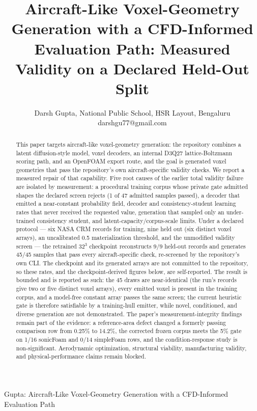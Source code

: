 \documentclass[journal]{IEEEtran}
\begin{document}
\title{Aircraft-Like Voxel-Geometry Generation with a CFD-Informed Evaluation Path: Measured Validity on a Declared Held-Out Split}
\author{Darsh Gupta, National Public School, HSR Layout, Bengaluru \\ darshgu77@gmail.com}

%
{Gupta: Aircraft-Like Voxel-Geometry Generation with a CFD-Informed Evaluation Path}

\maketitle

\begin{abstract}
This paper targets aircraft-like voxel-geometry generation: the repository combines a latent diffusion-style model, voxel decoders, an internal D3Q27 lattice-Boltzmann scoring path, and an OpenFOAM export route, and the goal is generated voxel geometries that pass the repository's own aircraft-specific validity checks. We report a measured repair of that capability. Five root causes of the earlier total validity failure are isolated by measurement: a procedural training corpus whose private gate admitted shapes the declared screen rejects (1 of 47 admitted samples passed), a decoder that emitted a near-constant probability field, decoder and consistency-student learning rates that never received the requested value, generation that sampled only an under-trained consistency student, and latent-capacity/corpus-scale limits. Under a declared protocol — six NASA CRM records for training, nine held out (six distinct voxel arrays), an uncalibrated 0.5 materialization threshold, and the unmodified validity screen — the retrained \(32^3\) checkpoint reconstructs 9/9 held-out records and generates 45/45 samples that pass every aircraft-specific check, re-screened by the repository's own CLI. The checkpoint and its generated arrays are not committed to the repository, so these rates, and the checkpoint-derived figures below, are self-reported. The result is bounded and is reported as such: the 45 draws are near-identical (the run's records give two or five distinct voxel arrays), every emitted voxel is present in the training corpus, and a model-free constant array passes the same screen; the current heuristic gate is therefore satisfiable by a training-hull emitter, while novel, conditioned, and diverse generation are not demonstrated. The paper's measurement-integrity findings remain part of the evidence: a reference-area defect changed a formerly passing comparison row from 0.25\% to 14.2\%, the corrected frozen corpus meets the 5\% gate on 1/16 sonicFoam and 0/14 simpleFoam rows, and the condition-response study is non-significant. Aerodynamic optimization, structural viability, manufacturing validity, and physical-performance claims remain blocked.
\end{abstract}
\end{document}
